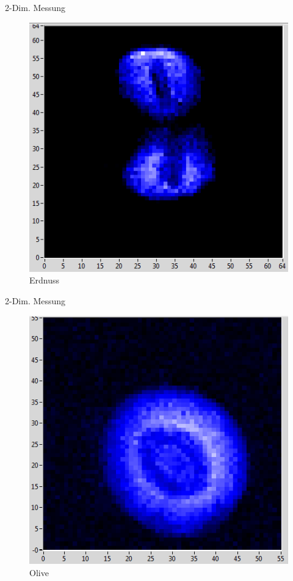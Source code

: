 \begin{frame}{2-Dim. Messung}
	\begin{figure}
	\centering
	\includegraphics[scale=.5]{..//figures//peanut.png}
	\caption{Erdnuss}
	\end{figure}
\end{frame}

\begin{frame}{2-Dim. Messung}
	\begin{figure}
	\centering
	\includegraphics[scale=.5]{..//figures//olive.png}
	\caption{Olive}
	\end{figure}
\end{frame}




